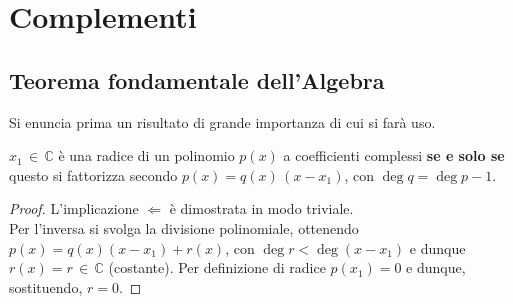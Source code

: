 \documentclass[10pt, oneside]{book}
\theoremstyle{plain}
\begin{document}
\chapter{Complementi}

\section{Teorema fondamentale dell'Algebra}
Si enuncia prima un risultato di grande importanza di cui si farà uso.
\begin{lem}
$x_1 \, \in \, \mathbb{C}$ è una radice di un polinomio $p(x)$ a coefficienti complessi \textbf{se e solo se} questo si fattorizza secondo $p(x) = q(x)\, (x-x_1)$, con $\deg q = \deg p - 1$.
\end{lem}
\begin{proof}
L'implicazione $\Leftarrow$ è dimostrata in modo triviale. 
\\Per l'inversa si svolga la divisione polinomiale, ottenendo $p(x) = q(x)(x-x_1) + r(x)$, con $\deg r < \deg (x-x_1)$ e dunque $r(x) = r \, \in \, \mathbb{C}$ (costante). Per definizione di radice $p(x_1) = 0$ e dunque, sostituendo, $r=0$.
\end{proof}
\end{document}
